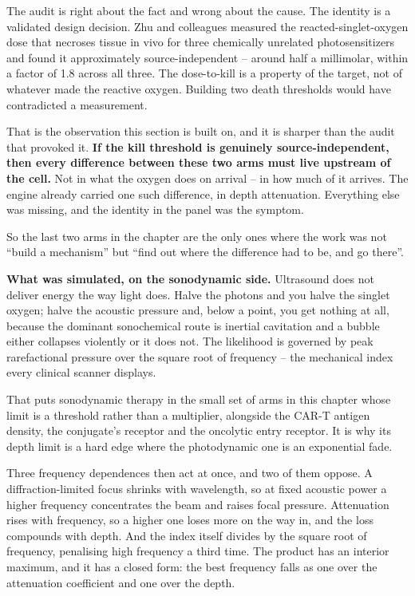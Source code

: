 \documentclass[11pt,twoside,openright]{report}
\begin{document}
The audit is right about the fact and wrong about the cause. The identity is a validated design decision. Zhu and colleagues measured the reacted-singlet-oxygen dose that necroses tissue in vivo for three chemically unrelated photosensitizers and found it approximately source-independent -- around half a millimolar, within a factor of 1.8 across all three. The dose-to-kill is a property of the target, not of whatever made the reactive oxygen. Building two death thresholds would have contradicted a measurement.

\begin{finding}
That is the observation this section is built on, and it is sharper than the audit that provoked it. \textbf{If the kill threshold is genuinely source-independent, then every difference between these two arms must live upstream of the cell.} Not in what the oxygen does on arrival -- in how much of it arrives. The engine already carried one such difference, in depth attenuation. Everything else was missing, and the identity in the panel was the symptom.

So the last two arms in the chapter are the only ones where the work was not ``build a mechanism'' but ``find out where the difference had to be, and go there''.
\end{finding}

\textbf{What was simulated, on the sonodynamic side.} Ultrasound does not deliver energy the way light does. Halve the photons and you halve the singlet oxygen; halve the acoustic pressure and, below a point, you get nothing at all, because the dominant sonochemical route is inertial cavitation and a bubble either collapses violently or it does not. The likelihood is governed by peak rarefactional pressure over the square root of frequency -- the mechanical index every clinical scanner displays.

That puts sonodynamic therapy in the small set of arms in this chapter whose limit is a threshold rather than a multiplier, alongside the CAR-T antigen density, the conjugate's receptor and the oncolytic entry receptor. It is why its depth limit is a hard edge where the photodynamic one is an exponential fade.

Three frequency dependences then act at once, and two of them oppose. A diffraction-limited focus shrinks with wavelength, so at fixed acoustic power a higher frequency concentrates the beam and raises focal pressure. Attenuation rises with frequency, so a higher one loses more on the way in, and the loss compounds with depth. And the index itself divides by the square root of frequency, penalising high frequency a third time. The product has an interior maximum, and it has a closed form: the best frequency falls as one over the attenuation coefficient and one over the depth.
\end{document}
